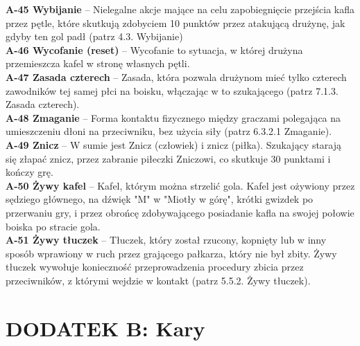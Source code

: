 \documentclass[11pt,a4paper]{article}
\newcommand{\psection}[1]{
  \section*{#1}
  \addcontentsline{toc}{section}{#1}
}
\begin{document}
\textbf{A-45 Wybijanie} – Nielegalne akcje mające na celu zapobiegnięcie przejścia kafla przez pętle, które skutkują zdobyciem 10 punktów przez atakującą drużynę, jak gdyby ten gol padł (patrz 4.3. Wybijanie)\\
\textbf{A-46 Wycofanie (reset)} – Wycofanie to sytuacja, w której drużyna przemieszcza kafel w stronę własnych pętli.\\
\textbf{A-47 Zasada czterech} – Zasada, która pozwala drużynom mieć tylko czterech zawodników tej samej płci na boisku, włączając w to szukającego (patrz 7.1.3. Zasada czterech).\\
\textbf{A-48 Zmaganie} – Forma kontaktu fizycznego między graczami polegająca na umieszczeniu dłoni na przeciwniku, bez użycia siły (patrz 6.3.2.1 Zmaganie).\\
\textbf{A-49 Znicz} – W sumie jest Znicz (człowiek) i znicz (piłka). Szukający starają się złapać znicz, przez zabranie piłeczki Zniczowi, co skutkuje 30 punktami i kończy grę.\\
\textbf{A-50 Żywy kafel} – Kafel, którym można strzelić gola. Kafel jest ożywiony przez sędziego głównego, na dźwięk "M" w "Miotły w górę", krótki gwizdek po przerwaniu gry, i przez obrońcę zdobywającego posiadanie kafla na swojej połowie boiska po stracie gola.\\
\textbf{A-51 Żywy tłuczek} – Tłuczek, który został rzucony, kopnięty lub w inny sposób wprawiony w ruch przez grającego pałkarza, który nie był zbity. Żywy tłuczek wywołuje konieczność przeprowadzenia procedury zbicia przez przeciwników, z którymi wejdzie w kontakt (patrz 5.5.2. Żywy tłuczek). \\

\psection{DODATEK B: Kary}

\listofbcc

\listofycc

\listofrcc

\listofpdc

\newpage
{}

\end{document}
